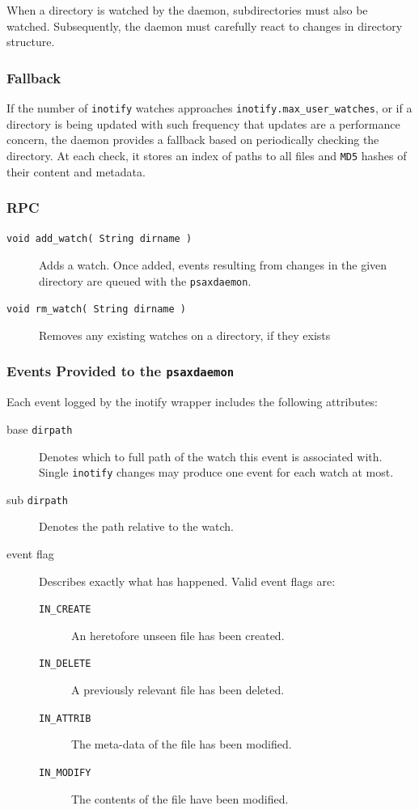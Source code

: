 \documentclass[a4paper]{report}
\newcommand{\inlinecode}{\texttt}
\begin{document}
When a directory is watched by the daemon, subdirectories must also be watched. Subsequently, the daemon must carefully react to changes in directory structure.

\subsubsection{Fallback}

If the number of \inlinecode{inotify} watches approaches \inlinecode{inotify.max\_user\_watches}, or if a directory is being updated with such frequency that updates are a performance concern, the daemon provides a fallback based on periodically checking the directory. At each check, it stores an index of paths to all files and \inlinecode{MD5} hashes of their content and metadata.

\subsubsection{RPC}

\begin{description}

\item[\inlinecode{void add\_watch( String dirname )}] Adds a watch. Once added, events resulting from changes in the given directory are queued with the \inlinecode{psaxdaemon}.

\item[\inlinecode{void rm\_watch( String dirname )}] Removes any existing watches on a directory, if they exists

\end{description}

\subsubsection{Events Provided to the \inlinecode{psaxdaemon}}

Each event logged by the inotify wrapper includes the following attributes:

\begin{description}
\item[base \inlinecode{dirpath}] Denotes which to full path of the watch this event is associated with. Single \inlinecode{inotify} changes may produce one event for each watch at most.
\item[sub \inlinecode{dirpath}] Denotes the path relative to the watch.
\item[event flag] Describes exactly what has happened. Valid event flags are:

\begin{description}
\item[\inlinecode{IN\_CREATE}] An heretofore unseen file has been created.
\item[\inlinecode{IN\_DELETE}] A previously relevant file has been deleted.
\item[\inlinecode{IN\_ATTRIB}] The meta-data of the file has been modified.
\item[\inlinecode{IN\_MODIFY}] The contents of the file have been modified.
\end{description}

\end{description}
\end{document}
